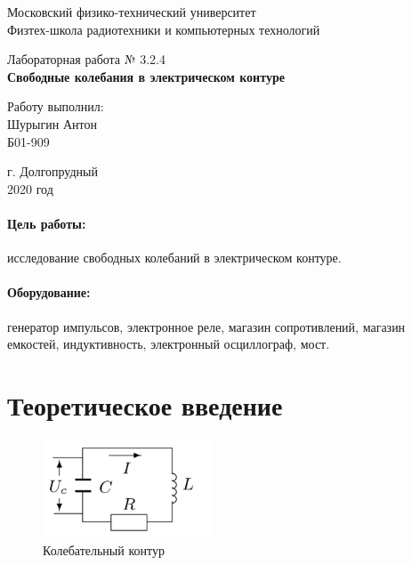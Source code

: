 \documentclass[a4paper,12pt]{article}
\begin{document}
\begin{titlepage}
	\begin{center}
		\large 	Московский физико-технический университет \\
		Физтех-школа радиотехники и компьютерных технологий\\
		\vspace{0.2cm}
		
		\vspace{4.5cm}
		Лабораторная работа № 3.2.4 \\ \vspace{0.2cm}
		\LARGE \textbf{Свободные колебания в электрическом контуре}
	\end{center}
	\vspace{2.3cm} \large
	
	\begin{center}
		Работу выполнил: \\
		Шурыгин Антон \\
		Б01-909

		
	\end{center}
	
	\begin{center} \vspace{60mm}
		г. Долгопрудный \\
		 2020 год
	\end{center}
\end{titlepage}




\paragraph*{Цель работы:} исследование свободных колебаний в электрическом контуре.

\paragraph*{Оборудование:} генератор импульсов, электронное реле, магазин сопротивлений, магазин емкостей, индуктивность, электронный осциллограф, мост.



\section{Теоретическое введение}

\begin{figure}[h]
	\includegraphics[width=5cm]{RLC.png}
	\caption{Колебательный контур}
	\label{RLC}
\end{figure}
\end{document}
